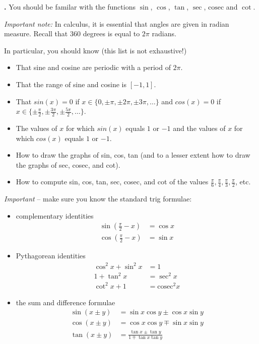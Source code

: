 \documentclass[t]{beamer}
\theoremstyle{plain}
\theoremstyle{definition}
\newcounter{heading}
\newcommand{\newhead}[1]{\medskip\stepcounter{heading}\noindent\textbf{\hspace{0.2cm}{#1}.}}
\newcommand{\cosec}{\mathrm{cosec}}
\begin{document}
\begin{frame}
\newhead{Trigonometric functions} You should be familar with the functions $\sin$, $\cos$, $\tan$, $\sec$, $\cosec$ and $\cot$.

\smallskip

\noindent\textit{Important note:} In calculus, it is essential that angles are given in radian measure. Recall that $360$ degrees is equal to $2\pi$ radians.

\vspace*{.3cm}
In particular, you should know (this list is not exhaustive!)
\begin{itemize}
\item That sine and cosine are periodic with a period of $2\pi$. 
\item That the range of sine and cosine is $[-1, 1]$.
\item That $sin(x) = 0$ if $x \in \{0, \pm \pi, \pm 2\pi, \pm 3\pi, \ldots\}$ and $cos(x) = 0$ if $x \in \{\pm \frac{\pi}{2}, \pm \frac{3\pi}{2}, \pm \frac{5\pi}{2}, \ldots\}$.
\item The values of $x$ for which $sin(x)$ equals $1$ or $-1$ and the values of $x$ for which $cos(x)$ equals $1$ or $-1$.
\item How to draw the graphs of sin, cos, tan (and to a lesser extent how to draw the graphs of sec, cosec, and cot).
\item How to compute sin, cos, tan, sec, cosec, and cot of the values $\frac{\pi}{6}, \frac{\pi}{4}, \frac{\pi}{3}, \frac{\pi}{2}$, etc.
\end{itemize} 
\end{frame}

\begin{frame}
\noindent\textit{Important} -- make sure you know the standard trig formulae:
\begin{itemize}
\item complementary identities
\begin{align*}
\sin\left(\frac{\pi}{2}-x\right)&=\cos x\\
\cos\left(\frac{\pi}{2}-x\right)&=\sin x
\end{align*}
\item Pythagorean identities
\begin{align*}
\cos^2x+\sin^2x&=1\\
1+\tan^2x&=\sec^2x\\
\cot^2x+1&=\cosec^2x
\end{align*}
\item the sum and difference formulae
\begin{align*}
\sin(x\pm y)&=\sin x\cos y\pm\cos x\sin y\\
\cos(x\pm y)&=\cos x\cos y\mp\sin x\sin y\\
\tan(x\pm y)&=\frac{\tan x\pm\tan y}{1\mp\tan x\tan y}
\end{align*}
\end{itemize} 
\end{frame}
\end{document}
